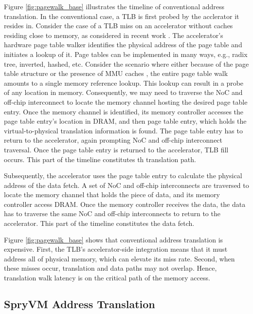 Figure \ref{fig:pagewalk_base} illustrates the timeline of
conventional address translation. In the conventional case, a TLB is
first probed by the acclerator it resides in. Consider the case of a
TLB miss on an accelerator without caches residing close to memory, as
considered in recent work \cite{haria:devirtualizing,
  picorel:near-memory}. The accelerator's hardware page table walker
identifies the physical address of the page table and initiates a
lookup of it. Page tables can be implemented in many ways, e.g., radix
tree, inverted, hashed, etc. Consider the scenario where either
because of the page table structure or the presence of MMU caches
\cite{bhattacharjee:large, barr:translation}, the entire page table
walk amounts to a single memory reference lookup. This lookup can
result in a probe of any location in memory. Consequently, we may need
to traverse the NoC and off-chip interconnect to locate the memory
channel hosting the desired page table entry. Once the memory channel
is identified, its memory controller accesses the page table entry's
location in DRAM, and then page table entry, which holds the
virtual-to-physical translation information is found. The page table
entry has to return to the accelerator, again prompting NoC and
off-chip interconnect traversal. Once the page table entry is returned
to the accelerator, TLB fill occurs. This part of the timeline
constitutes th translation path. 

Subsequently, the accelerator uses the page table entry to calculate
the physical address of the data fetch. A set of NoC and off-chip
interconnects are traversed to locate the memory channel that holds
the piece of data, and its memory controller access DRAM. Once the
memory controller receives the data, the data has to traverse the same
NoC and off-chip interconnects to return to the accelerator. This part
of the timeline constitutes the data fetch.

Figure \ref{fig:pagewalk_base} shows that conventional address
translation is expensive. First, the TLB's accelerator-side
integration means that it must address all of physical memory, which
can elevate its miss rate. Second, when these misses occur,
translation and data paths may not overlap. Hence, translation walk
latency is on the critical path of the memory access.


\subsection{SpryVM Address Translation}

